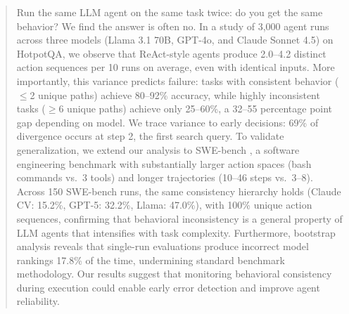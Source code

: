 \documentclass{article}
\begin{document}

\printAffiliationsAndNotice{}

\begin{abstract}
Run the same LLM agent on the same task twice: do you get the same behavior? We find the answer is often no. In a study of 3,000 agent runs across three models (Llama 3.1 70B, GPT-4o, and Claude Sonnet 4.5) on HotpotQA, we observe that ReAct-style agents produce 2.0--4.2 distinct action sequences per 10 runs on average, even with identical inputs. More importantly, this variance predicts failure: tasks with consistent behavior ($\leq$2 unique paths) achieve 80--92\% accuracy, while highly inconsistent tasks ($\geq$6 unique paths) achieve only 25--60\%, a 32--55 percentage point gap depending on model. We trace variance to early decisions: 69\% of divergence occurs at step 2, the first search query. To validate generalization, we extend our analysis to SWE-bench \citep{swebench}, a software engineering benchmark with substantially larger action spaces (bash commands vs.\ 3 tools) and longer trajectories (10--46 steps vs.\ 3--8). Across 150 SWE-bench runs, the same consistency hierarchy holds (Claude CV: 15.2\%, GPT-5: 32.2\%, Llama: 47.0\%), with 100\% unique action sequences, confirming that behavioral inconsistency is a general property of LLM agents that intensifies with task complexity. Furthermore, bootstrap analysis reveals that single-run evaluations produce incorrect model rankings 17.8\% of the time, undermining standard benchmark methodology. Our results suggest that monitoring behavioral consistency during execution could enable early error detection and improve agent reliability.
\end{abstract}
\end{document}
